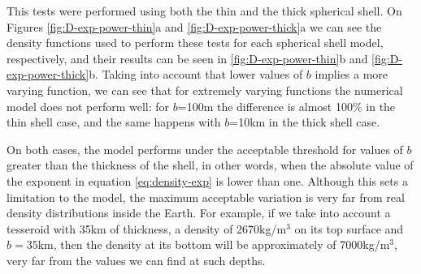 \documentclass[extra]{gji}
\begin{document}
This tests were performed using both the thin and the thick spherical shell.
On Figures \ref{fig:D-exp-power-thin}a and \ref{fig:D-exp-power-thick}a we can see the density functions used to perform these tests for each spherical shell model, respectively, and their results can be seen in \ref{fig:D-exp-power-thin}b and \ref{fig:D-exp-power-thick}b.
Taking into account that lower values of $b$ implies a more varying function, we can see that for extremely varying functions the numerical model does not perform well: for $b$=100m the difference is almost 100\% in the thin shell case, and the same happens with $b$=10km in the thick shell case.

On both cases, the model performs under the acceptable threshold for values of $b$ greater than the thickness of the shell, in other words, when the absolute value of the exponent in equation \ref{eq:density-exp} is lower than one.
Although this sets a limitation to the model, the maximum acceptable variation is very far from real density distributions inside the Earth.
For example, if we take into account a tesseroid with 35km of thickness, a density of 2670kg/m$^3$ on its top surface and $b=35$km, then the density at its bottom will be approximately of 7000kg/m$^3$, very far from the values we can find at such depths.
\end{document}
